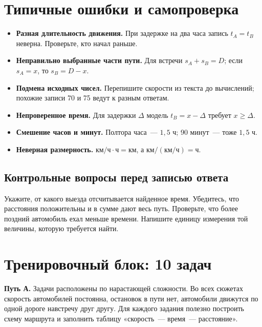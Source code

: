 \documentclass[a4paper,11pt]{article}
\begin{document}
\section{Типичные ошибки и самопроверка}
\begin{itemize}
\item \textbf{Разная длительность движения.} При задержке на два часа запись $t_A=t_B$ неверна. Проверьте, кто начал раньше.
\item \textbf{Неправильно выбранные части пути.} Для встречи $s_A+s_B=D$; если $s_A=x$, то $s_B=D-x$.
\item \textbf{Подмена исходных чисел.} Перепишите скорости из текста до вычислений; похожие записи 70 и 75 ведут к разным ответам.
\item \textbf{Непроверенное время.} Для задержки $\Delta$ модель $t_B=x-\Delta$ требует $x\geq\Delta$.
\item \textbf{Смешение часов и минут.} Полтора часа~--- $1{,}5$ ч; 90 минут~--- тоже $1{,}5$ ч.
\item \textbf{Неверная размерность.} $\text{км/ч}\cdot\text{ч}=\text{км}$, а $\text{км}/(\text{км/ч})=\text{ч}$.
\end{itemize}
\subsection{Контрольные вопросы перед записью ответа}
Укажите, от какого выезда отсчитывается найденное время. Убедитесь, что расстояния положительны и в сумме дают весь путь. Проверьте, что более поздний автомобиль ехал меньше времени. Напишите единицу измерения той величины, которую требуется найти.

\clearpage
\section*{Тренировочный блок: 10 задач}
\noindent\textcolor{darkaccent}{\bfseries Путь А.} Задачи расположены по нарастающей сложности. Во всех сюжетах скорость автомобилей постоянна, остановок в пути нет, автомобили движутся по одной дороге навстречу друг другу. Для каждого задания полезно построить схему маршрута и заполнить таблицу «скорость~--- время~--- расстояние».
\end{document}
